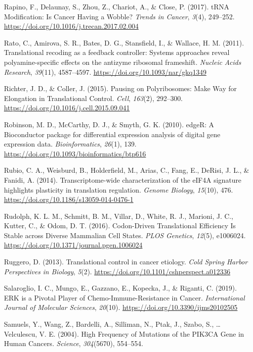 \documentclass[12pt,openany]{book}
\begin{document}
\hypertarget{ref-Rapino2017}{}
Rapino, F., Delaunay, S., Zhou, Z., Chariot, A., \& Close, P. (2017).
tRNA Modification: Is Cancer Having a Wobble? \emph{Trends in Cancer},
\emph{3}(4), 249--252.
\url{https://doi.org/10.1016/j.trecan.2017.02.004}

\hypertarget{ref-Rato2011}{}
Rato, C., Amirova, S. R., Bates, D. G., Stansfield, I., \& Wallace, H.
M. (2011). Translational recoding as a feedback controller: Systems
approaches reveal polyamine-specific effects on the antizyme ribosomal
frameshift. \emph{Nucleic Acids Research}, \emph{39}(11), 4587--4597.
\url{https://doi.org/10.1093/nar/gkq1349}

\hypertarget{ref-Richter2015}{}
Richter, J. D., \& Coller, J. (2015). Pausing on Polyribosomes: Make Way
for Elongation in Translational Control. \emph{Cell}, \emph{163}(2),
292--300. \url{https://doi.org/10.1016/j.cell.2015.09.041}

\hypertarget{ref-Robinson2010}{}
Robinson, M. D., McCarthy, D. J., \& Smyth, G. K. (2010). edgeR: A
Bioconductor package for differential expression analysis of digital
gene expression data. \emph{Bioinformatics}, \emph{26}(1), 139.
\url{https://doi.org/10.1093/bioinformatics/btp616}

\hypertarget{ref-Rubio2014}{}
Rubio, C. A., Weisburd, B., Holderfield, M., Arias, C., Fang, E.,
DeRisi, J. L., \& Fanidi, A. (2014). Transcriptome-wide characterization
of the eIF4A signature highlights plasticity in translation regulation.
\emph{Genome Biology}, \emph{15}(10), 476.
\url{https://doi.org/10.1186/s13059-014-0476-1}

\hypertarget{ref-Rudolph2016}{}
Rudolph, K. L. M., Schmitt, B. M., Villar, D., White, R. J., Marioni, J.
C., Kutter, C., \& Odom, D. T. (2016). Codon-Driven Translational
Efficiency Is Stable across Diverse Mammalian Cell States. \emph{PLOS
Genetics}, \emph{12}(5), e1006024.
\url{https://doi.org/10.1371/journal.pgen.1006024}

\hypertarget{ref-Ruggero2013}{}
Ruggero, D. (2013). Translational control in cancer etiology. \emph{Cold
Spring Harbor Perspectives in Biology}, \emph{5}(2).
\url{https://doi.org/10.1101/cshperspect.a012336}

\hypertarget{ref-Salaroglio2019}{}
Salaroglio, I. C., Mungo, E., Gazzano, E., Kopecka, J., \& Riganti, C.
(2019). ERK is a Pivotal Player of Chemo-Immune-Resistance in Cancer.
\emph{International Journal of Molecular Sciences}, \emph{20}(10).
\url{https://doi.org/10.3390/ijms20102505}

\hypertarget{ref-Samuels2004}{}
Samuels, Y., Wang, Z., Bardelli, A., Silliman, N., Ptak, J., Szabo, S.,
\ldots{} Velculescu, V. E. (2004). High Frequency of Mutations of the
PIK3CA Gene in Human Cancers. \emph{Science}, \emph{304}(5670),
554--554.
\end{document}
